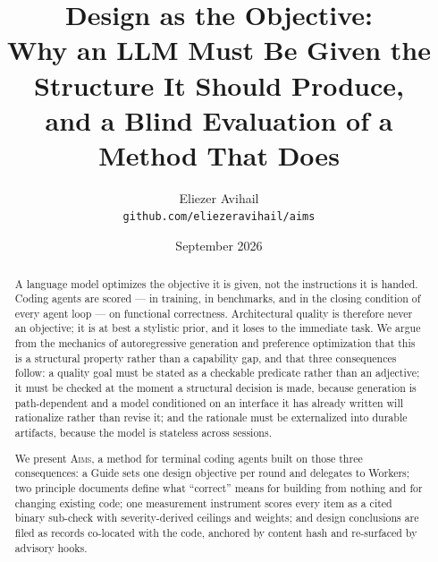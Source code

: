 \documentclass[11pt]{article}
\title{\textbf{Design as the Objective:\\ Why an LLM Must Be Given the Structure It Should Produce,\\ and a Blind Evaluation of a Method That Does}}
\author{Eliezer Avihail\\ \texttt{github.com/eliezeravihail/aims}}
\date{September 2026}
\newcommand{\aims}{\textsc{Aims}}
\begin{document}
\maketitle

\begin{abstract}
A language model optimizes the objective it is given, not the instructions it is handed. Coding agents are scored --- in training, in benchmarks, and in the closing condition of every agent loop --- on functional correctness. Architectural quality is therefore never an objective; it is at best a stylistic prior, and it loses to the immediate task. We argue from the mechanics of autoregressive generation and preference optimization that this is a structural property rather than a capability gap, and that three consequences follow: a quality goal must be stated as a checkable predicate rather than an adjective; it must be checked at the moment a structural decision is made, because generation is path-dependent and a model conditioned on an interface it has already written will rationalize rather than revise it; and the rationale must be externalized into durable artifacts, because the model is stateless across sessions.

We present \aims{}, a method for terminal coding agents built on those three consequences: a Guide sets one design objective per round and delegates to Workers; two principle documents define what ``correct'' means for building from nothing and for changing existing code; one measurement instrument scores every item as a cited binary sub-check with severity-derived ceilings and weights; and design conclusions are filed as records co-located with the code, anchored by content hash and re-surfaced by advisory hooks.


\end{abstract}
\end{document}
